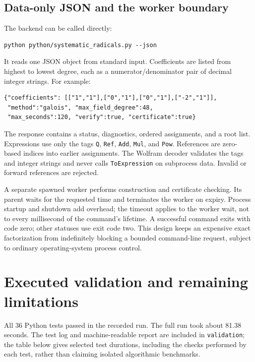 \documentclass[11pt,a4paper]{article}
\theoremstyle{definition}
\theoremstyle{remark}
\newcommand{\code}[1]{\texttt{#1}}
\begin{document}
\subsection{Data-only JSON and the worker boundary}
The backend can be called directly:
\begin{lstlisting}
python python/systematic_radicals.py --json
\end{lstlisting}
It reads one JSON object from standard input. Coefficients are listed from
highest to lowest degree, each as a numerator/denominator pair of decimal
integer strings. For example:
\begin{lstlisting}
{"coefficients": [["1","1"],["0","1"],["0","1"],["-2","1"]],
 "method":"galois", "max_field_degree":48,
 "max_seconds":120, "verify":true, "certificate":true}
\end{lstlisting}
The response contains a status, diagnostics, ordered assignments, and a root
list. Expressions use only the tags \code{Q}, \code{Ref}, \code{Add},
\code{Mul}, and \code{Pow}. References are zero-based indices into earlier
assignments. The Wolfram decoder validates the tags and integer strings and
never calls \code{ToExpression} on subprocess data. Invalid or forward
references are rejected.

A separate spawned worker performs construction and certificate checking. Its
parent waits for the requested time and terminates the worker on expiry.
Process startup and shutdown add overhead; the timeout applies to the worker
wait, not to every millisecond of the command's lifetime. A successful
command exits with code zero; other statuses use exit code two. This design
keeps an expensive exact factorization from indefinitely blocking a bounded
command-line request, subject to ordinary operating-system process control.

\section{Executed validation and remaining limitations}
\label{sec:validation}
All 36 Python tests passed in the recorded run. The full run took about
81.38 seconds. The test log and machine-readable report are included in
\code{validation}; the table below gives selected test durations, including the
checks performed by each test, rather than claiming isolated algorithmic
benchmarks.
\end{document}
